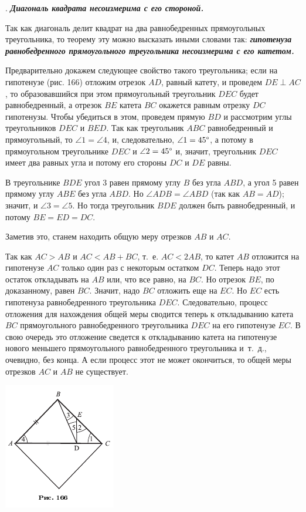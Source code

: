 \documentclass[oneside]{book}
\begin{document}
.
\textbf{\emph{Диагональ квадрата несоизмерима с его стороной.}}

Так как диагональ делит квадрат на два равнобедренных прямоугольных треугольника, то теорему эту можно высказать иными словами так:
\textbf{\emph{гипотенуза равнобедренного прямоугольного треугольника несоизмерима с его катетом.}}

Предварительно докажем следующее свойство такого треугольника;
если на гипотенузе (рис. 166) отложим отрезок $AD$, равный катету, и проведем $DE\perp AC$, то образовавшийся при этом прямоугольный треугольник $DEC$ будет равнобедренный, а отрезок $BE$ катета $BC$ окажется равным отрезку $DC$ гипотенузы.
Чтобы убедиться в этом, проведем прямую $BD$ и рассмотрим углы треугольников $DEC$ и $BED$.
Так как треугольник $ABC$ равнобедренный и прямоугольный, то $\angle 1 = \angle 4$, и, следовательно, $\angle 1 = 45\degree$, а потому в прямоугольном треугольнике $DEC$ и $\angle 2 = 45\degree$ и, значит, треугольник $DEC$ имеет два равных угла и потому его стороны $DC$ и $DE$ равны.

В треугольнике $BDE$ угол 3 равен прямому углу $B$ без угла $ABD$, а угол 5 равен прямому углу $ABE$ без угла $ABD$.
Но $\angle ADB = \angle ABD$ (так как $AB=AD$);
значит, и $\angle 3 = \angle 5$.
Но тогда треугольник $BDE$ должен быть равнобедренный, и потому $BE=ED=DC$.

Заметив это, станем находить общую меру отрезков $AB$ и $AC$.

Так как $AC>AB$ и $AC<AB+BC$, т.~е.
$AC<2AB$, то катет $AB$ отложится на гипотенузе $AC$ только один раз с некоторым остатком $DC$.
Теперь надо этот остаток откладывать на $AB$ или, что все равно, на $BC$.
Но отрезок $BE$, по доказанному, равен $BC$.
Значит, надо $BC$ отложить еще на $EC$.
Но $EC$ есть гипотенуза равнобедренного треугольника $DEC$.
Следовательно, процесс отложения для нахождения общей меры сводится теперь к откладыванию катета $BC$ прямоугольного равнобедренного треугольника $DEC$ на его гипотенузе $EC$.
В свою очередь это отложение сведется к откладыванию катета на гипотенузе нового меньшего прямоугольного равнобедренного треугольника и~т.~д., очевидно, без конца.
А если процесс этот не может окончиться, то общей меры отрезков $AC$ и $AB$ не существует.

\includegraphics{pics/ris-166}
\end{document}
